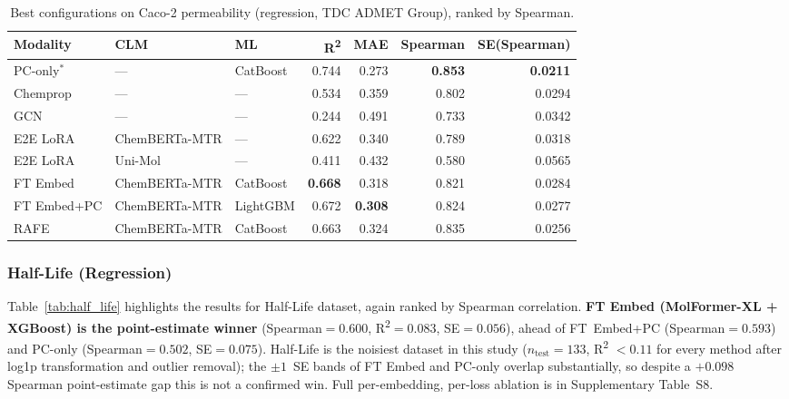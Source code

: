 \documentclass[final,1p,times]{elsarticle}
\begin{document}
\begin{table}[!ht]
\centering
\caption{Best configurations on Caco-2 permeability (regression, TDC ADMET Group), ranked by Spearman.}
\label{tab:caco2}
\begin{adjustbox}{max width=\textwidth}
\begin{tabular}{lllrrrr}
\toprule
Modality & CLM & ML & R\textsuperscript{2} & MAE & Spearman & SE(Spearman) \\
\midrule
PC-only$^*$ & --- & CatBoost & 0.744 & 0.273 & \textbf{0.853} & \textbf{0.0211} \\
Chemprop    & --- & --- & 0.534 & 0.359 & 0.802 & 0.0294 \\
GCN         & --- & --- & 0.244 & 0.491 & 0.733 & 0.0342 \\
\midrule
E2E LoRA    & ChemBERTa-MTR & --- & 0.622 & 0.340 & 0.789 & 0.0318 \\
E2E LoRA    & Uni-Mol       & --- & 0.411 & 0.432 & 0.580 & 0.0565 \\
\midrule
FT Embed    & ChemBERTa-MTR & CatBoost & \textbf{0.668} & 0.318 & 0.821 & 0.0284 \\
FT Embed+PC & ChemBERTa-MTR & LightGBM & 0.672 & \textbf{0.308} & 0.824 & 0.0277 \\
RAFE        & ChemBERTa-MTR & CatBoost & 0.663 & 0.324 & 0.835 & 0.0256 \\
\bottomrule
\end{tabular}
\end{adjustbox}
\end{table}

\subsubsection{Half-Life (Regression)}
Table~\ref{tab:half_life} highlights the results for Half-Life dataset, again ranked by Spearman correlation. \textbf{FT Embed (MolFormer-XL + XGBoost) is the point-estimate winner} (Spearman$=0.600$, R\textsuperscript{2}$=0.083$, SE$=0.056$), ahead of FT~Embed+PC (Spearman$=0.593$) and PC-only (Spearman$=0.502$, SE$=0.075$). Half-Life is the noisiest dataset in this study ($n_\text{test}=133$, R\textsuperscript{2} $< 0.11$ for every method after log1p transformation and outlier removal); the $\pm1$~SE bands of FT Embed and PC-only overlap substantially, so despite a $+0.098$ Spearman point-estimate gap this is not a confirmed win. Full per-embedding, per-loss ablation is in Supplementary Table~S8.
\end{document}
